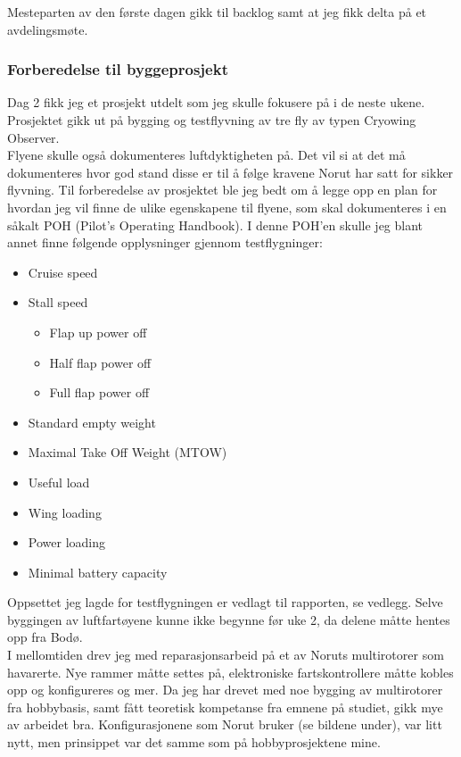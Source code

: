 \documentclass[12pt, a4paper]{article}
\begin{document}
\newpage
Mesteparten av den første dagen gikk til backlog samt at jeg fikk delta på et avdelingsmøte.\\
\subsubsection{Forberedelse til byggeprosjekt}
Dag 2 fikk jeg et prosjekt utdelt som jeg skulle fokusere på i de neste ukene. Prosjektet gikk ut på bygging og testflyvning av tre fly av typen Cryowing Observer. \\
Flyene skulle også dokumenteres luftdyktigheten på. Det vil si at det må dokumenteres hvor god stand disse er til å følge kravene Norut har satt for sikker flyvning. Til forberedelse av prosjektet ble jeg bedt om å legge opp en plan for hvordan jeg vil finne de ulike egenskapene til flyene, som skal dokumenteres i en såkalt POH (Pilot's Operating Handbook). I denne POH'en skulle jeg blant annet finne følgende opplysninger gjennom testflygninger: 
\begin{itemize}
	\item Cruise speed
	\item Stall speed
	\begin{itemize}
		\item Flap up power off
		\item Half flap power off
		\item Full flap power off	
	\end{itemize}
	\item Standard empty weight
	\item Maximal Take Off Weight (MTOW)
	\item Useful load
	\item Wing loading
	\item Power loading
	\item Minimal battery capacity
\end{itemize}
Oppsettet jeg lagde for testflygningen er vedlagt til rapporten, se vedlegg. 
Selve byggingen av luftfartøyene kunne ikke begynne før uke 2, da delene måtte hentes opp fra Bodø. \\ 
\newpage
I mellomtiden drev jeg med reparasjonsarbeid på et av Noruts multirotorer som havarerte. Nye rammer måtte settes på, elektroniske fartskontrollere måtte kobles opp og konfigureres og mer. Da jeg har drevet med noe bygging av multirotorer fra hobbybasis, samt fått teoretisk kompetanse fra emnene på studiet, gikk mye av arbeidet bra. Konfigurasjonene som Norut bruker (se bildene under), var litt nytt, men prinsippet var det samme som på hobbyprosjektene mine. \\
\end{document}

